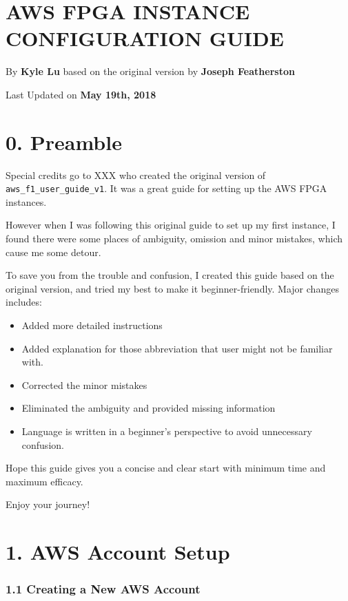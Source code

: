 \documentclass[]{article}
\date{}
\begin{document}
\hypertarget{header-n0}{%
\section{AWS FPGA INSTANCE CONFIGURATION GUIDE}\label{header-n0}}

By \textbf{Kyle Lu} based on the original version by \textbf{Joseph
Featherston}

Last Updated on \textbf{May 19th, 2018}

\tableofcontents

\hypertarget{header-n13}{%
\section{0. Preamble}\label{header-n13}}

Special credits go to XXX who created the original version of
\texttt{aws\_f1\_user\_guide\_v1}. It was a great guide for setting up
the AWS FPGA instances.

However when I was following this original guide to set up my first
instance, I found there were some places of ambiguity, omission and
minor mistakes, which cause me some detour.

To save you from the trouble and confusion, I created this guide based
on the original version, and tried my best to make it beginner-friendly.
Major changes includes:

\begin{itemize}
\item
  Added more detailed instructions 
\item
  Added explanation for those abbreviation that user might not be
  familiar with.
\item
  Corrected the minor mistakes
\item
  Eliminated the ambiguity and provided missing information
\item
  Language is written in a beginner's perspective to avoid unnecessary
  confusion.
\end{itemize}

Hope this guide gives you a concise and clear start with minimum time
and maximum efficacy.

Enjoy your journey!

\hypertarget{header-n42}{%
\section{1. AWS Account Setup}\label{header-n42}}

\hypertarget{header-n43}{%
\subsubsection{1.1 Creating a New AWS Account}\label{header-n43}}
\end{document}
